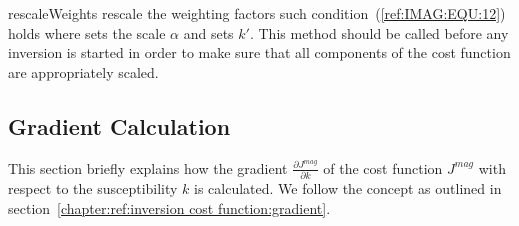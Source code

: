 \begin{methoddesc}[MagneticModel]{rescaleWeights}{
 }
rescale the weighting factors such condition~(\ref{ref:IMAG:EQU:12}) holds where 
 sets the scale $\alpha$
and  sets $k'$. This method should be called before any inversion is started
in order to make sure that all components of the cost function are appropriately scaled.
\end{methoddesc}


\subsection{Gradient Calculation}
This section briefly explains how the gradient
$\frac{\partial J^{mag}}{\partial k}$ of the cost function $J^{mag}$ with
respect to the susceptibility $k$ is calculated.  We follow the concept as outlined in section~\ref{chapter:ref:inversion cost function:gradient}.

